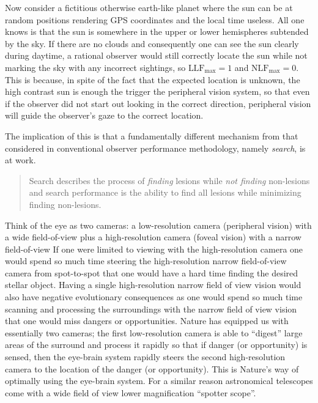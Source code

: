 \documentclass[
]{book}
\begin{document}
Now consider a fictitious otherwise earth-like planet where the sun can be at random positions rendering GPS coordinates and the local time useless. All one knows is that the sun is somewhere in the upper or lower hemispheres subtended by the sky. If there are no clouds and consequently one can see the sun clearly during daytime, a rational observer would still correctly locate the sun while not marking the sky with any incorrect sightings, so \(\text{LLF}_{\text{max}} = 1\) and \(\text{NLF}_{\text{max}} = 0\). This is because, in spite of the fact that the expected location is unknown, the high contrast sun is enough the trigger the peripheral vision system, so that even if the observer did not start out looking in the correct direction, peripheral vision will guide the observer's gaze to the correct location.

The implication of this is that a fundamentally different mechanism from that considered in conventional observer performance methodology, namely \emph{search}, is at work.

\begin{quote}
Search describes the process of \emph{finding} lesions while \emph{not finding} non-lesions and search performance is the ability to find all lesions while minimizing finding non-lesions.
\end{quote}

Think of the eye as two cameras: a low-resolution camera (peripheral vision) with a wide field-of-view plus a high-resolution camera (foveal vision) with a narrow field-of-view If one were limited to viewing with the high-resolution camera one would spend so much time steering the high-resolution narrow field-of-view camera from spot-to-spot that one would have a hard time finding the desired stellar object. Having a single high-resolution narrow field of view vision would also have negative evolutionary consequences as one would spend so much time scanning and processing the surroundings with the narrow field of view vision that one would miss dangers or opportunities. Nature has equipped us with essentially two cameras; the first low-resolution camera is able to ``digest'' large areas of the surround and process it rapidly so that if danger (or opportunity) is sensed, then the eye-brain system rapidly steers the second high-resolution camera to the location of the danger (or opportunity). This is Nature's way of optimally using the eye-brain system. For a similar reason astronomical telescopes come with a wide field of view lower magnification ``spotter scope''.
\end{document}

